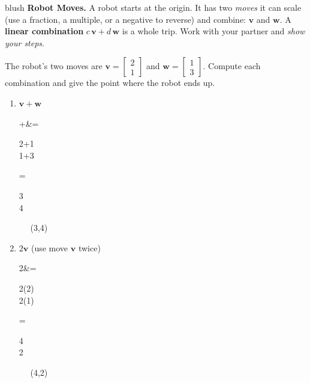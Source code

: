 \documentclass[10pt]{article}
\newcommand{\vv}{\mathbf{v}}
\newcommand{\ww}{\mathbf{w}}
\begin{document}

\vspace{0.10in}

\begin{headlinebox}{blush}
\small\textbf{Robot Moves.} A robot starts at the origin. It has two \emph{moves} it can scale
(use a fraction, a multiple, or a negative to reverse) and combine: $\vv$ and $\ww$. A
\textbf{linear combination} $c\,\vv + d\,\ww$ is a whole trip. Work with your partner and
\emph{show your steps}.
\end{headlinebox}

\vspace{0.10in}

\begin{tcolorbox}[colback=white, colframe=black!40, title=\textbf{Tier R --- Remediate},
    fonttitle=\bfseries, arc=1.5mm, left=3mm, right=3mm, top=2mm, bottom=2mm, breakable]
The robot's two moves are $\vv = \begin{bmatrix} 2 \\ 1 \end{bmatrix}$ and
$\ww = \begin{bmatrix} 1 \\ 3 \end{bmatrix}$. Compute each combination and give the point where
the robot ends up.
\begin{enumerate}[leftmargin=1.7em, itemsep=8pt]
  \item $\vv + \ww$
\begin{work}
  \vv+\ww &= \begin{bsmallmatrix} 2+1 \\ 1+3 \end{bsmallmatrix}
           = \begin{bsmallmatrix} 3 \\ 4 \end{bsmallmatrix}
           \ \  (3,4)
\end{work}
  \item $2\vv$ (use move $\vv$ twice)
\begin{work}
  2\vv &= \begin{bsmallmatrix} 2(2) \\ 2(1) \end{bsmallmatrix}
        = \begin{bsmallmatrix} 4 \\ 2 \end{bsmallmatrix}
        \ \  (4,2)
\end{work}

\end{enumerate}
\end{tcolorbox}
\end{document}
